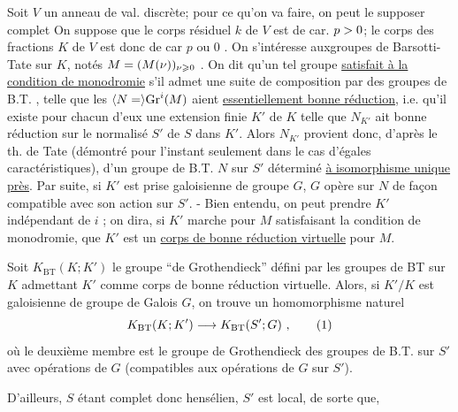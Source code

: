 Soit $V$ un anneau de val. discrète; pour ce qu'on va faire, on peut le supposer complet  On suppose que le corps résiduel $k$ de $V$ est de car. $p>0$; le corps des fractions $K$ de $V$ est donc de car $p$ ou $0$ . On  s'intéresse auxgroupes de Barsotti-Tate sur $K$, notés $M=(M(\nu))_{\nu\geqslant0}$ . On dit qu'un tel groupe \uline{satisfait à la condition de monodromie} s'il admet une suite de composition par des groupes de B.T. , telle que les $\inserted{N=}\mathrm{Gr}^{i}(M)$ aient \uline{essentiellement bonne réduction}, i.e. qu'il existe pour chacun d'eux une extension finie  $K'$ de $K$ telle que  $N_{K'}$ ait bonne réduction sur le normalisé $S'$ de $S$ dans $K'$. Alors $N_{K'}$ provient  donc, d'après le th. de Tate (démontré pour l'instant seulement dans le cas d'égales caractéristiques), d'un  groupe de B.T. $N$ sur $S'$ déterminé \uline{à isomorphisme unique près}. Par suite, si $K'$ est prise galoisienne de groupe $G$, $G$ opère sur  $N$ de façon compatible avec son action sur $S'$. - Bien entendu, on peut prendre $K'$ indépendant de $i$ ; on dira, si $K'$ marche pour $M$ satisfaisant la condition de monodromie, que $K'$ est un \uline{corps de bonne réduction virtuelle} pour $M$.

Soit $K_{\mathrm{BT}}(K;K')$ le groupe ``de Grothendieck''  défini par les groupes de BT sur $K$ admettant $K'$ comme corps de bonne réduction virtuelle. Alors, si $K'/K$ est galoisienne de groupe de Galois $G$, on trouve un homomorphisme naturel
\[
K_{\mathrm{BT}}(K;K')\handwritten{\longrightarrow}K_{\mathrm{BT}}(S';G)\ ,\tag*{\handwritten{(1)}}
\]
où le deuxième membre est le groupe de Grothendieck des groupes de B.T. sur $S'$ avec opérations de $G$ (compatibles aux opérations de $G$ sur $S'$).

D'ailleurs, $S$ étant complet donc hensélien, $S'$ est local, de sorte que,

